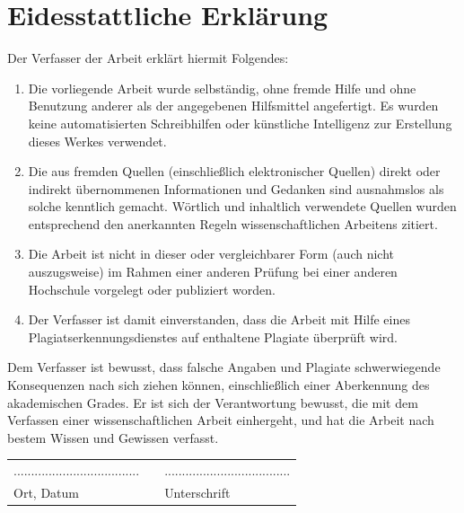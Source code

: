 \section*{Eidesstattliche Erklärung}
Der Verfasser der Arbeit erklärt hiermit Folgendes:

\begin{enumerate}
  \item Die vorliegende Arbeit wurde selbständig, ohne fremde Hilfe und ohne Benutzung anderer als der angegebenen Hilfsmittel angefertigt. Es wurden keine automatisierten Schreibhilfen oder künstliche Intelligenz zur Erstellung dieses Werkes verwendet.
  \item Die aus fremden Quellen (einschließlich elektronischer Quellen) direkt oder indirekt übernommenen Informationen und Gedanken sind ausnahmslos als solche kenntlich gemacht. Wörtlich und inhaltlich verwendete Quellen wurden entsprechend den anerkannten Regeln wissenschaftlichen Arbeitens zitiert.
  \item Die Arbeit ist nicht in dieser oder vergleichbarer Form (auch nicht auszugsweise) im Rahmen einer anderen Prüfung bei einer anderen Hochschule vorgelegt oder publiziert worden.
  \item Der Verfasser ist damit einverstanden, dass die Arbeit mit Hilfe eines Plagiatserkennungsdienstes auf enthaltene Plagiate überprüft wird.
\end{enumerate}

Dem Verfasser ist bewusst, dass falsche Angaben und Plagiate schwerwiegende Konsequenzen nach sich ziehen können, einschließlich einer Aberkennung des akademischen Grades. Er ist sich der Verantwortung bewusst, die mit dem Verfassen einer wissenschaftlichen Arbeit einhergeht, und hat die Arbeit nach bestem Wissen und Gewissen verfasst.


\vspace{2cm}

\noindent
\begin{tabular}{lcl}
  .................................... & \hspace{.4\textwidth} & ....................................\\
  Ort, Datum &  & Unterschrift

\end{tabular}
